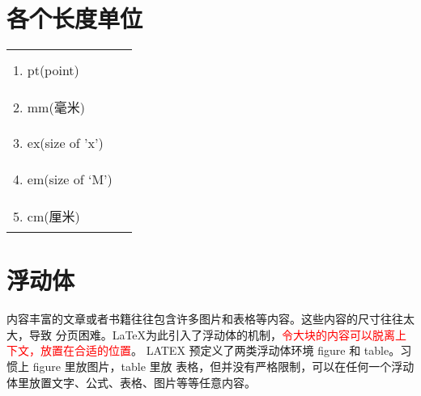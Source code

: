 \documentclass[fontset=windows]{article}
\begin{document}
\section{各个长度单位}
\newcommand{\red}[1]{\textcolor{red}{#1}}

\begin{example}
    \begin{tabular}{l|l}
        \hline\\
       1. pt(point) & \red{\rule{1pt}{1pt}}\\
       \hline\\
       2. mm(毫米) &\red{\rule{1mm}{1mm}}\\
       \hline\\
       3. ex(size of 'x') &\red{\rule{1ex}{1ex}}\\
       \hline\\
       4. em(size of `M') &\red{\rule{1em}{1em}}\\
       \hline\\
       5. cm(厘米) &\red{\rule{1cm}{1cm}}\\
       \hline
    \end{tabular}
\end{example}

\section{浮动体}
内容丰富的文章或者书籍往往包含许多图片和表格等内容。这些内容的尺寸往往太大，导致
分页困难。\LaTeX 为此引入了浮动体的机制，\red{令大块的内容可以脱离上下文，放置在合适的位置}。
LATEX 预定义了两类浮动体环境 figure 和 table。习惯上 figure 里放图片，table 里放
表格，但并没有严格限制，可以在任何一个浮动体里放置文字、公式、表格、图片等等任意内容。
\newpage
\end{document}
